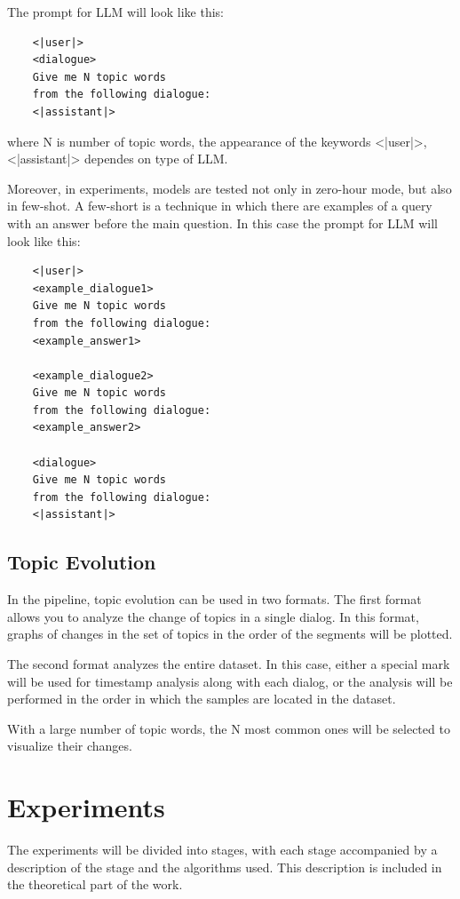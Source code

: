 \documentclass[PMI,VKR]{HSEUniversity}
\begin{document}
The prompt for LLM will look like this:

\begin{lstlisting}
    <|user|> 
    <dialogue> 
    Give me N topic words 
    from the following dialogue:
    <|assistant|>
\end{lstlisting}

where N is number of topic words, the appearance of the keywords <|user|>, <|assistant|> dependes on type of LLM.

Moreover, in experiments, models are tested not only in zero-hour mode, but also in few-shot.
A few-short is a technique in which there are examples of a query with an answer before the main question.
In this case the prompt for LLM will look like this:

\begin{lstlisting}
    <|user|> 
    <example_dialogue1> 
    Give me N topic words 
    from the following dialogue:
    <example_answer1>

    <example_dialogue2> 
    Give me N topic words 
    from the following dialogue:
    <example_answer2>

    <dialogue> 
    Give me N topic words 
    from the following dialogue:
    <|assistant|>
\end{lstlisting}

\section{Topic Evolution}

In the pipeline, topic evolution can be used in two formats. 
The first format allows you to analyze the change of topics in a single dialog. In this format, graphs of changes in the set of topics in the order of the segments will be plotted. 

The second format analyzes the entire dataset. 
In this case, either a special mark will be used for timestamp analysis along with each dialog, or the analysis will be performed in the order in which the samples are located in the dataset.

With a large number of topic words, the N most common ones will be selected to visualize their changes.

\chapter{Experiments}

The experiments will be divided into stages, with each stage accompanied by a description of the stage and the algorithms used. 
This description is included in the theoretical part of the work.
\end{document}

